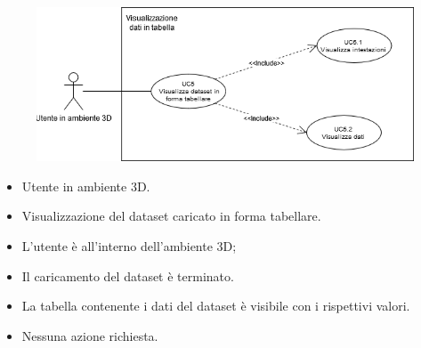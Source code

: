 \begin{figure}[h!]
    \centering
    \includegraphics[scale=0.7]{template/images/UC5.png}
    \caption{}
\end{figure}
\UCdsc
    { %
        \begin{itemize}
            \item Utente in ambiente 3D.
        \end{itemize}
    }
    { %
        \begin{itemize}
            \item Visualizzazione del dataset caricato in forma tabellare.
        \end{itemize}
    }
    { %
        \begin{itemize}
            \item L'utente è all'interno dell'ambiente 3D;
            \item Il caricamento del dataset è terminato.
        \end{itemize}
    }
    { %
        \begin{itemize}
            \item La tabella contenente i dati del dataset è visibile con i rispettivi valori.
        \end{itemize}
    }
    { %
        \begin{itemize}
            \item Nessuna azione richiesta.
        \end{itemize}
    }


